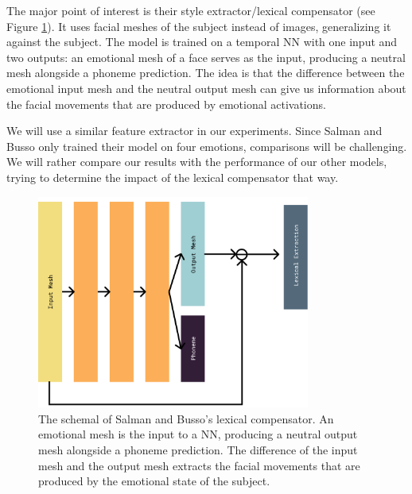 The major point of interest is their style extractor/lexical compensator (see Figure \ref{fig:bussose}). It uses facial meshes of the subject instead of images, generalizing it against the subject. The model is trained on a temporal NN with one input and two outputs: an emotional mesh of a face serves as the input, producing a neutral mesh alongside a phoneme prediction. The idea is that the difference between the emotional input mesh and the neutral output mesh can give us information about the facial movements that are produced by emotional activations.

We will use a similar feature extractor in our experiments. Since Salman and Busso only trained their model on four emotions, comparisons will be challenging. We will rather compare our results with the performance of our other models, trying to determine the impact of the lexical compensator that way. 

\begin{figure}
    \centering
    \includegraphics[width=0.8\textwidth]{res/BussoSE.pdf}
    \caption{The schemal of Salman and Busso's lexical compensator. An emotional mesh is the input to a NN, producing a neutral output mesh alongside a phoneme prediction. The difference of the input mesh and the output mesh extracts the facial movements that are produced by the emotional state of the subject.}
    \label{fig:bussose}
\end{figure}
